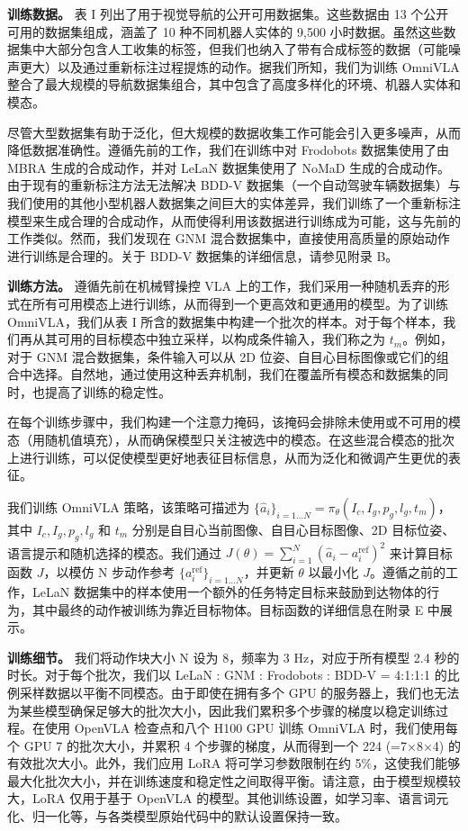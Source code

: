 \textbf{训练数据。} 表 I 列出了用于视觉导航的公开可用数据集。这些数据由 13 个公开可用的数据集组成，涵盖了 10 种不同机器人实体的 9,500 小时数据。虽然这些数据集中大部分包含人工收集的标签，但我们也纳入了带有合成标签的数据（可能噪声更大）以及通过重新标注过程提炼的动作。据我们所知，我们为训练 OmniVLA 整合了最大规模的导航数据集组合，其中包含了高度多样化的环境、机器人实体和模态。

尽管大型数据集有助于泛化，但大规模的数据收集工作可能会引入更多噪声，从而降低数据准确性。遵循先前的工作，我们在训练中对 Frodobots 数据集使用了由 MBRA 生成的合成动作，并对 LeLaN 数据集使用了 NoMaD 生成的合成动作。由于现有的重新标注方法无法解决 BDD-V 数据集（一个自动驾驶车辆数据集）与我们使用的其他小型机器人数据集之间巨大的实体差异，我们训练了一个重新标注模型来生成合理的合成动作，从而使得利用该数据进行训练成为可能，这与先前的工作类似。然而，我们发现在 GNM 混合数据集中，直接使用高质量的原始动作进行训练是合理的。关于 BDD-V 数据集的详细信息，请参见附录 B。

\textbf{训练方法。} 遵循先前在机械臂操控 VLA 上的工作，我们采用一种随机丢弃的形式在所有可用模态上进行训练，从而得到一个更高效和更通用的模型。为了训练 OmniVLA，我们从表 I 所含的数据集中构建一个批次的样本。对于每个样本，我们再从其可用的目标模态中独立采样，以构成条件输入，我们称之为 $t_m$。例如，对于 GNM 混合数据集，条件输入可以从 2D 位姿、自目心目标图像或它们的组合中选择。自然地，通过使用这种丢弃机制，我们在覆盖所有模态和数据集的同时，也提高了训练的稳定性。

在每个训练步骤中，我们构建一个注意力掩码，该掩码会排除未使用或不可用的模态（用随机值填充），从而确保模型只关注被选中的模态。在这些混合模态的批次上进行训练，可以促使模型更好地表征目标信息，从而为泛化和微调产生更优的表征。

我们训练 OmniVLA 策略，该策略可描述为 $\{\hat{a}_i\}_{i=1...N} = \pi_\theta(I_c, I_g, p_g, l_g, t_m)$，其中 $I_c, I_g, p_g, l_g$ 和 $t_m$ 分别是自目心当前图像、自目心目标图像、2D 目标位姿、语言提示和随机选择的模态。我们通过 $J(\theta) = \sum_{i=1}^{N} (\hat{a}_i - a_i^{\text{ref}})^2$ 来计算目标函数 $J$，以模仿 N 步动作参考 $\{a_i^{\text{ref}}\}_{i=1...N}$，并更新 $\theta$ 以最小化 $J$。遵循之前的工作，LeLaN 数据集中的样本使用一个额外的任务特定目标来鼓励到达物体的行为，其中最终的动作被训练为靠近目标物体。目标函数的详细信息在附录 E 中展示。

\textbf{训练细节。} 我们将动作块大小 N 设为 8，频率为 3 Hz，对应于所有模型 2.4 秒的时长。对于每个批次，我们以 LeLaN : GNM : Frodobots : BDD-V = 4:1:1:1 的比例采样数据以平衡不同模态。由于即使在拥有多个 GPU 的服务器上，我们也无法为某些模型确保足够大的批次大小，因此我们累积多个步骤的梯度以稳定训练过程。在使用 OpenVLA 检查点和八个 H100 GPU 训练 OmniVLA 时，我们使用每个 GPU 7 的批次大小，并累积 4 个步骤的梯度，从而得到一个 224 (=7×8×4) 的有效批次大小。此外，我们应用 LoRA 将可学习参数限制在约 5\%，这使我们能够最大化批次大小，并在训练速度和稳定性之间取得平衡。请注意，由于模型规模较大，LoRA 仅用于基于 OpenVLA 的模型。其他训练设置，如学习率、语言词元化、归一化等，与各类模型原始代码中的默认设置保持一致。


